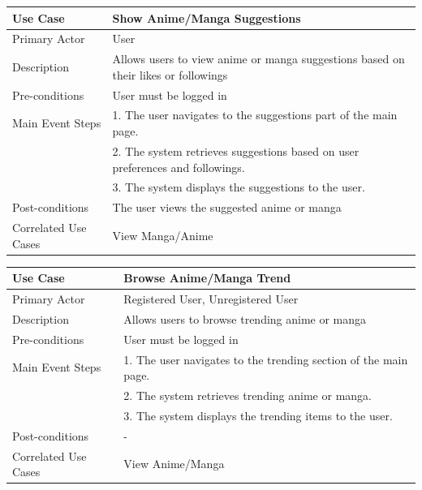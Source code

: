 \begin{longtable}{|p{}|p{}|}
    \hline
    \rowcolor{lightblue}
    \textbf{Use Case} & \textbf{Show Anime/Manga Suggestions} \\
    \hline
    Primary Actor &User \\
    \hline
    Description & Allows users to view anime or manga suggestions based on their likes or followings\\
    \hline
    Pre-conditions & User must be logged in\\
    \hline
    Main Event Steps & 1. The user navigates to the suggestions part of the main page. \\
    & 2. The system retrieves suggestions based on user preferences and followings. \\
    & 3. The system displays the suggestions to the user. \\
    \hline
    Post-conditions & The user views the suggested anime or manga\\
    \hline
    Correlated Use Cases & View Manga/Anime\\
    \hline
\end{longtable}

\newpage

\begin{longtable}{|p{}|p{}|}
    \hline
    \rowcolor{lightblue}
    \textbf{Use Case} & \textbf{Browse Anime/Manga Trend} \\
    \hline
    Primary Actor & Registered User, Unregistered User\\
    \hline
    Description &Allows users to browse trending anime or manga\\
    \hline
    Pre-conditions & User must be logged in\\
    \hline
    Main Event Steps & 1. The user navigates to the trending section of the main page. \\
    & 2. The system retrieves trending anime or manga. \\
    & 3. The system displays the trending items to the user. \\
    \hline
    Post-conditions &-\\
    \hline
    Correlated Use Cases &View Anime/Manga \\
    \hline
\end{longtable}


